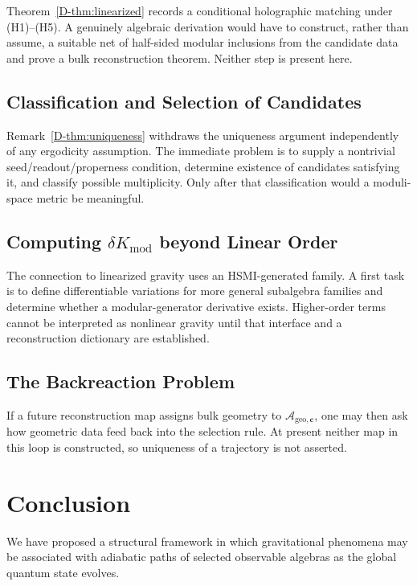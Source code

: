 \documentclass[12pt,a4paper,openany]{book}
\begin{document}
Theorem~\ref{D-thm:linearized} records a conditional holographic matching under (H1)--(H5). A genuinely algebraic derivation would have to construct, rather than assume, a suitable net of half-sided modular inclusions from the candidate data and prove a bulk reconstruction theorem.  Neither step is present here.

\subsection{Classification and Selection of Candidates}

Remark~\ref{D-thm:uniqueness} withdraws the uniqueness argument independently of any ergodicity assumption.  The immediate problem is to supply a nontrivial seed/readout/properness condition, determine existence of candidates satisfying it, and classify possible multiplicity.  Only after that classification would a moduli-space metric be meaningful.

\subsection{Computing $\delta K_{\mathrm{mod}}$ beyond Linear Order}

The connection to linearized gravity uses an HSMI-generated family.  A first task is to define differentiable variations for more general subalgebra families and determine whether a modular-generator derivative exists.  Higher-order terms cannot be interpreted as nonlinear gravity until that interface and a reconstruction dictionary are established.

\subsection{The Backreaction Problem}

If a future reconstruction map assigns bulk geometry to $\mathcal{A}_{\mathrm{geo},\mathbf{c}}$, one may then ask how geometric data feed back into the selection rule.  At present neither map in this loop is constructed, so uniqueness of a trajectory is not asserted.

\section{Conclusion}
\label{D-sec:conclusion}

We have proposed a structural framework in which gravitational phenomena may be associated with adiabatic paths of selected observable algebras as the global quantum state evolves.
\end{document}
